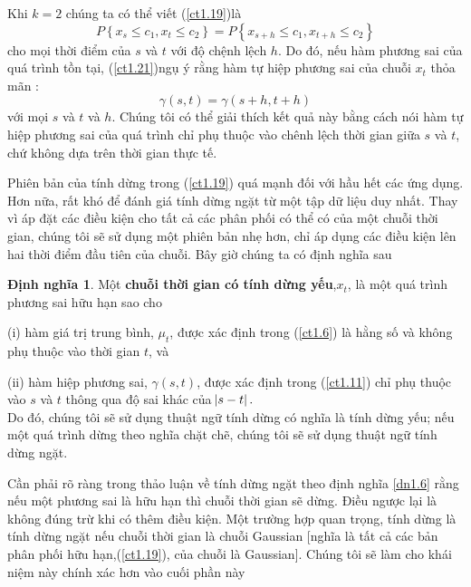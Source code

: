 \documentclass[12pt, a4paper,oneside]{book}
\theoremstyle{definition}
\newtheorem{dn}[theo]{Định nghĩa}
\begin{document}
Khi $k=2$ chúng ta có thể viết (\ref{ct1.19})là
\begin{equation}
P\left\lbrace x_{s}\le c_{1},x_{t}\le c_{2}\right\rbrace = P\left\lbrace x_{s+h}\le c_{1},x_{t+h}\le c_{2}\right\rbrace \label{ct1.21}
\end{equation}
cho mọi thời điểm của $ s $ và $ t $ với độ chệnh lệch $ h $. Do đó, nếu hàm phương sai của quá trình tồn tại, (\ref{ct1.21})ngụ ý rằng hàm tự hiệp phương sai của chuỗi $x_{t}$ thỏa mãn :
	$$\gamma(s,t)=\gamma(s+h,t+h)$$
với mọi $s$ và $t$ và $h$. Chúng tôi có thể giải thích kết quả này bằng cách nói hàm tự hiệp phương sai của quá trình chỉ phụ thuộc vào chênh lệch thời gian giữa $s$ và $t$, chứ không dựa trên thời gian thực tế.

Phiên bản của tính dừng trong (\ref{ct1.19}) quá mạnh đối với hầu hết các ứng dụng. Hơn nữa, rất khó để đánh giá tính dừng ngặt từ một tập dữ liệu duy nhất. Thay vì áp đặt các điều kiện cho tất cả các phân phối có thể có của một chuỗi thời gian, chúng tôi sẽ sử dụng một phiên bản nhẹ hơn, chỉ áp dụng các điều kiện lên hai thời điểm đầu tiên của chuỗi. Bây giờ chúng ta có định nghĩa sau
\begin{dn}Một \textbf{chuỗi thời gian có tính dừng yếu},$x_{t}$, là một quá trình phương sai hữu hạn sao cho
	
	(i) hàm giá trị trung bình, $\mu_{t}$, được xác định trong (\ref{ct1.6}) là hằng số và không phụ thuộc vào thời gian $t$, và
	
	(ii) hàm hiệp phương sai, $ \gamma(s, t)$, được xác định trong (\ref{ct1.11}) chỉ phụ thuộc vào $s$ và $t$ thông qua độ sai khác của $ \abs{s-t}.$\\	
Do đó, chúng tôi sẽ sử dụng thuật ngữ tính dừng có nghĩa là tính dừng yếu; nếu một quá trình dừng theo nghĩa chặt chẽ, chúng tôi sẽ sử dụng thuật ngữ tính dừng ngặt.
\end{dn}

Cần phải rõ ràng trong thảo luận về tính dừng ngặt theo định nghĩa \ref{dn1.6} rằng nếu một phương sai là hữu hạn thì chuỗi thời gian sẽ dừng. Điều ngược lại là không đúng trừ khi có thêm điều kiện. Một trường hợp quan trọng, tính dừng là tính dừng ngặt nếu chuỗi thời gian là chuỗi Gaussian [nghĩa là tất cả các bản phân phối hữu hạn,(\ref{ct1.19}), của chuỗi là Gaussian]. Chúng tôi sẽ làm cho khái niệm này chính xác hơn vào cuối phần này
\end{document}
